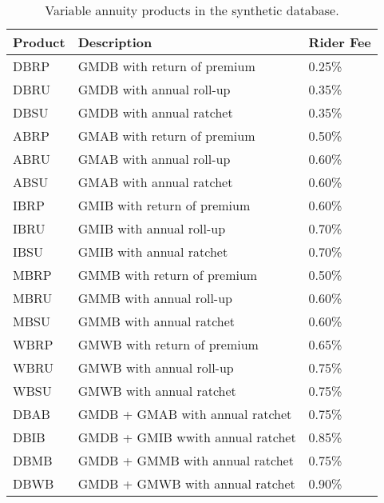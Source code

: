 \begin{table}
\begin{center}
\begin{small}
\begin{tabular}{l l l}
\toprule
Product & Description                 & Rider Fee  \\
\midrule
DBRP    & GMDB with return of premium & 0.25\%     \\
DBRU    & GMDB with annual roll-up     & 0.35\%     \\
DBSU    & GMDB with annual ratchet     & 0.35\%     \\
ABRP    & GMAB with return of premium & 0.50\%     \\
ABRU    & GMAB with annual roll-up     & 0.60\%     \\
ABSU    & GMAB with annual ratchet     & 0.60\%     \\
IBRP    & GMIB with return of premium & 0.60\%     \\
IBRU    & GMIB with annual roll-up     & 0.70\%     \\
IBSU    & GMIB with annual ratchet     & 0.70\%     \\
MBRP    & GMMB with return of premium & 0.50\%     \\
MBRU    & GMMB with annual roll-up     & 0.60\%     \\
MBSU    & GMMB with annual ratchet     & 0.60\%     \\
WBRP    & GMWB with return of premium & 0.65\%     \\
WBRU    & GMWB with annual roll-up     & 0.75\%     \\
WBSU    & GMWB with annual ratchet     & 0.75\%     \\
DBAB    & GMDB + GMAB with annual ratchet & 0.75\%     \\
DBIB    & GMDB + GMIB wwith annual ratchet     & 0.85\%     \\
DBMB    & GMDB + GMMB with annual ratchet     & 0.75\%     \\
DBWB    & GMDB + GMWB with annual ratchet & 0.90\% \\
\bottomrule
\end{tabular}
\end{small}
\end{center}	
\caption{Variable annuity products in the synthetic database.}\label{tab:prods}
\end{table}
	

